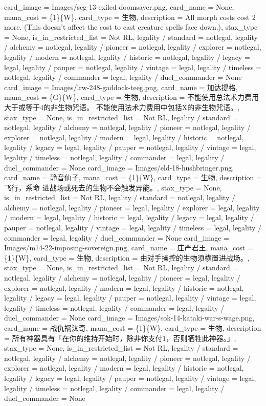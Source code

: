 \documentclass[lang = cn, color = black, 10pt]{AllThatStax}
\begin{document}
\card
{
	card_image = Images/scg-13-exiled-doomsayer.png,
	card_name = None,
	mana_cost = \{1\}\{W\},
	card_type = 生物,
	description = All morph costs cost {2} more. (This doesn't affect the cost to cast creature spells face down.),
	stax_type = None,
	is_in_restricted_list = Not RL,
	legality / standard = notlegal,
	legality / alchemy = notlegal,
	legality / pioneer = notlegal,
	legality / explorer = notlegal,
	legality / modern = notlegal,
	legality / historic = notlegal,
	legality / legacy = legal,
	legality / pauper = notlegal,
	legality / vintage = legal,
	legality / timeless = notlegal,
	legality / commander = legal,
	legality / duel_commander = None
}
\card
{
	card_image = Images/lrw-248-gaddock-teeg.png,
	card_name = 加达提格,
	mana_cost = \{G\}\{W\},
	card_type = 生物,
	description = 不能使用总法术力费用大于或等于4的非生物咒语。
	不能使用法术力费用中包括{X}的非生物咒语。,
	stax_type = None,
	is_in_restricted_list = Not RL,
	legality / standard = notlegal,
	legality / alchemy = notlegal,
	legality / pioneer = notlegal,
	legality / explorer = notlegal,
	legality / modern = legal,
	legality / historic = notlegal,
	legality / legacy = legal,
	legality / pauper = notlegal,
	legality / vintage = legal,
	legality / timeless = notlegal,
	legality / commander = legal,
	legality / duel_commander = None
}
\card
{
	card_image = Images/eld-18-hushbringer.png,
	card_name = 静音仙子,
	mana_cost = \{1\}\{W\},
	card_type = 生物,
	description = 飞行，系命
	进战场或死去的生物不会触发异能。,
	stax_type = None,
	is_in_restricted_list = Not RL,
	legality / standard = notlegal,
	legality / alchemy = notlegal,
	legality / pioneer = legal,
	legality / explorer = legal,
	legality / modern = legal,
	legality / historic = legal,
	legality / legacy = legal,
	legality / pauper = notlegal,
	legality / vintage = legal,
	legality / timeless = legal,
	legality / commander = legal,
	legality / duel_commander = None
}
\card
{
	card_image = Images/m14-22-imposing-sovereign.png,
	card_name = 庄严君王,
	mana_cost = \{1\}\{W\},
	card_type = 生物,
	description = 由对手操控的生物须横置进战场。,
	stax_type = None,
	is_in_restricted_list = Not RL,
	legality / standard = notlegal,
	legality / alchemy = notlegal,
	legality / pioneer = legal,
	legality / explorer = notlegal,
	legality / modern = legal,
	legality / historic = notlegal,
	legality / legacy = legal,
	legality / pauper = notlegal,
	legality / vintage = legal,
	legality / timeless = notlegal,
	legality / commander = legal,
	legality / duel_commander = None
}
\card
{
	card_image = Images/sok-14-kataki-war-s-wage.png,
	card_name = 战仇祸汰奇,
	mana_cost = \{1\}\{W\},
	card_type = 生物,
	description = 所有神器具有「在你的维持开始时，除非你支付{1}，否则牺牲此神器。」,
	stax_type = None,
	is_in_restricted_list = Not RL,
	legality / standard = notlegal,
	legality / alchemy = notlegal,
	legality / pioneer = notlegal,
	legality / explorer = notlegal,
	legality / modern = legal,
	legality / historic = notlegal,
	legality / legacy = legal,
	legality / pauper = notlegal,
	legality / vintage = legal,
	legality / timeless = notlegal,
	legality / commander = legal,
	legality / duel_commander = None
}
\end{document}
